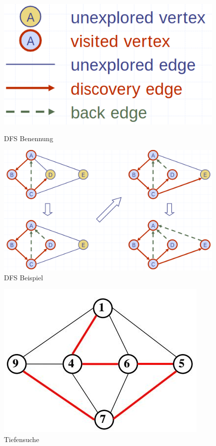 \begin{figure}[ht!]
	\centering
	\begin{minipage}[t]{0.5\textwidth}
		\centering
		\includegraphics[width=0.7\linewidth]{images/dfs_pfeile}
		\caption{DFS Benennung}
		\label{fig:dfsbenennung}
	\end{minipage}
	\centering
	\begin{minipage}[t]{1\textwidth}
		\centering
		\includegraphics[width=0.9\linewidth]{images/dfs_beispiel}
		\caption{DFS Beispiel}
		\label{fig:dfsbeispiel}
	\end{minipage}
\end{figure}

\begin{figure}[h!]
	\centering
	\includegraphics[width=0.5\linewidth]{images/tiefensuche}
	\caption{Tiefensuche}
	\label{fig:tiefensuche}
\end{figure}


